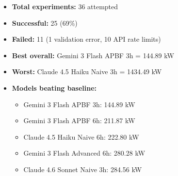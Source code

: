 \documentclass{article}
\begin{document}
\begin{itemize}
\item \textbf{Total experiments:} 36 attempted
\item \textbf{Successful:} 25 (69\%)
\item \textbf{Failed:} 11 (1 validation error, 10 API rate limits)
\item \textbf{Best overall:} Gemini 3 Flash APBF 3h = 144.89 kW
\item \textbf{Worst:} Claude 4.5 Haiku Naive 3h = 1434.49 kW
\item \textbf{Models beating baseline:}
  \begin{itemize}
  \item Gemini 3 Flash APBF 3h: 144.89 kW
  \item Gemini 3 Flash APBF 6h: 211.87 kW
  \item Claude 4.5 Haiku Naive 6h: 222.80 kW
  \item Gemini 3 Flash Advanced 6h: 280.28 kW
  \item Claude 4.6 Sonnet Naive 3h: 284.56 kW
  \end{itemize}
\end{itemize}
\end{document}
